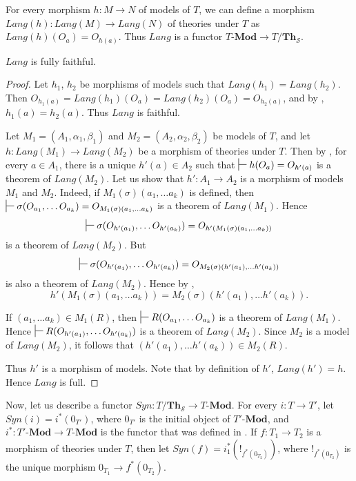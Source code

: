 \documentclass{mscs}
\newcommand{\cat}[1]{\mathbf{#1}}
\newcommand{\Mod}[1]{#1\text{-}\cat{Mod}}
\newcommand{\Th}{\cat{Th}}
\numberwithin{figure}{section}
\begin{document}
For every morphism $h : M \to N$ of models of $T$, we can define a morphism $Lang(h) : Lang(M) \to Lang(N)$ of theories under $T$ as $Lang(h)(O_a) = O_{h(a)}$.
Thus $Lang$ is a functor $\Mod{T} \to T/\Th_\mathcal{S}$.

\begin{prop}[lang-ff]
$Lang$ is fully faithful.
\end{prop}
\begin{proof}
Let $h_1$, $h_2$ be morphisms of models such that $Lang(h_1) = Lang(h_2)$.
Then $O_{h_1(a)} = Lang(h_1)(O_a) = Lang(h_2)(O_a) = O_{h_2(a)}$, and by , $h_1(a) = h_2(a)$.
Thus $Lang$ is faithful.

Let $M_1 = (A_1,\alpha_1,\beta_1)$ and $M_2 = (A_2,\alpha_2,\beta_2)$ be models of $T$,
    and let $h : Lang(M_1) \to Lang(M_2)$ be a morphism of theories under $T$.
Then by , for every $a \in A_1$, there is a unique $h'(a) \in A_2$ such that $\sststile{}{} h(O_a) = O_{h'(a)}$ is a theorem of $Lang(M_2)$.
Let us show that $h' : A_1 \to A_2$ is a morphism of models $M_1$ and $M_2$.
Indeed, if $M_1(\sigma)(a_1, \ldots a_k)$ is defined, then $\sststile{}{} \sigma(O_{a_1}, \ldots O_{a_k}) = O_{M_1(\sigma)(a_1, \ldots a_k)}$ is a theorem of $Lang(M_1)$.
Hence \[ \sststile{}{} \sigma(O_{h'(a_1)}, \ldots O_{h'(a_k)}) = O_{h'(M_1(\sigma)(a_1, \ldots a_k))} \] is a theorem of $Lang(M_2)$.
But \[ \sststile{}{} \sigma(O_{h'(a_1)}, \ldots O_{h'(a_k)}) = O_{M_2(\sigma)(h'(a_1), \ldots h'(a_k))} \] is also a theorem of $Lang(M_2)$.
Hence by ,
\[ h'(M_1(\sigma)(a_1, \ldots a_k)) = M_2(\sigma)(h'(a_1), \ldots h'(a_k)). \]

If $(a_1, \ldots a_k) \in M_1(R)$, then $\sststile{}{} R(O_{a_1}, \ldots O_{a_k})$ is a theorem of $Lang(M_1)$.
Hence $\sststile{}{} R(O_{h'(a_1)}, \ldots O_{h'(a_k)})$ is a theorem of $Lang(M_2)$.
Since $M_2$ is a model of $Lang(M_2)$, it follows that $(h'(a_1), \ldots h'(a_k)) \in M_2(R)$.

Thus $h'$ is a morphism of models.
Note that by definition of $h'$, $Lang(h') = h$.
Hence $Lang$ is full.
\end{proof}

Now, let us describe a functor $Syn : T/\Th_\mathcal{S} \to \Mod{T}$.
For every $i : T \to T'$, let $Syn(i) = i^*(0_{T'})$, where $0_{T'}$ is the initial object of $\Mod{T'}$,
    and $i^* : \Mod{T'} \to \Mod{T}$ is the functor that was defined in \cite{alg-tt}.
If $f : T_1 \to T_2$ is a morphism of theories under $T$, then let $Syn(f) = i_1^*(!_{f^*(0_{T_2})})$,
    where $!_{f^*(0_{T_2})}$ is the unique morphism $0_{T_1} \to f^*(0_{T_2})$.
\end{document}
